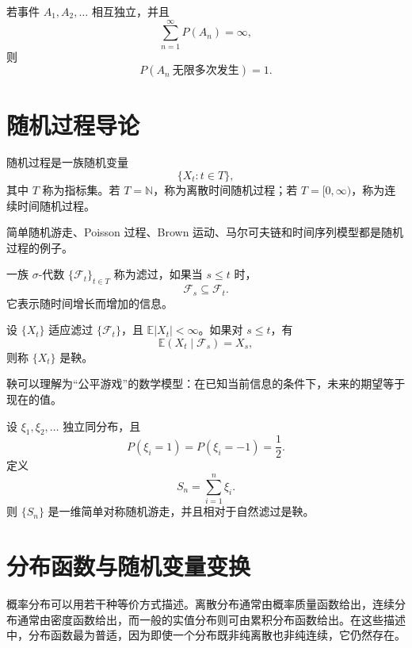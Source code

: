 \begin{theorem}
若事件 $A_1,A_2,\dots$ 相互独立，并且
\[
    \sum_{n=1}^{\infty}P(A_n)=\infty,
\]
则
\[
    P(A_n\ \text{无限多次发生})=1.
\]
\end{theorem}

\section{随机过程导论}

\begin{definition}[随机过程]
随机过程是一族随机变量
\[
    \{X_t:t\in T\},
\]
其中 $T$ 称为指标集。若 $T=\mathbb{N}$，称为离散时间随机过程；若 $T=[0,\infty)$，称为连续时间随机过程。
\end{definition}

\begin{example}
简单随机游走、Poisson 过程、Brown 运动、马尔可夫链和时间序列模型都是随机过程的例子。
\end{example}

\begin{definition}[滤过]
一族 $\sigma$-代数 $\{\mathcal{F}_t\}_{t\in T}$ 称为滤过，如果当 $s\le t$ 时，
\[
    \mathcal{F}_s\subseteq\mathcal{F}_t.
\]
它表示随时间增长而增加的信息。
\end{definition}

\begin{definition}[鞅]
设 $\{X_t\}$ 适应滤过 $\{\mathcal{F}_t\}$，且 $\mathbb{E}|X_t|<\infty$。如果对 $s\le t$，有
\[
    \mathbb{E}(X_t\mid\mathcal{F}_s)=X_s,
\]
则称 $\{X_t\}$ 是鞅。
\end{definition}

\begin{remark}
鞅可以理解为“公平游戏”的数学模型：在已知当前信息的条件下，未来的期望等于现在的值。
\end{remark}

\begin{example}[简单随机游走]
设 $\xi_1,\xi_2,\dots$ 独立同分布，且
\[
    P(\xi_i=1)=P(\xi_i=-1)=\frac12.
\]
定义
\[
    S_n=\sum_{i=1}^n \xi_i.
\]
则 $\{S_n\}$ 是一维简单对称随机游走，并且相对于自然滤过是鞅。
\end{example}

\section{分布函数与随机变量变换}

概率分布可以用若干种等价方式描述。离散分布通常由概率质量函数给出，连续分布通常由密度函数给出，而一般的实值分布则可由累积分布函数给出。在这些描述中，分布函数最为普适，因为即使一个分布既非纯离散也非纯连续，它仍然存在。


